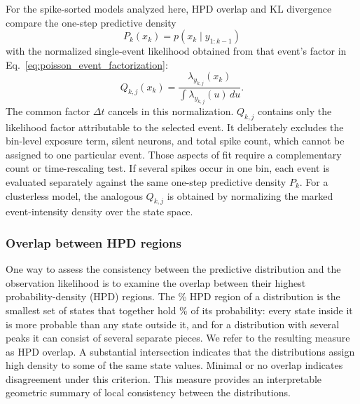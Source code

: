 \documentclass[12pt]{article}
\begin{document}
For the spike-sorted models analyzed here, HPD overlap and KL divergence compare the one-step predictive density
\begin{equation*}
    P_k(x_k) = p(x_k \mid y_{1:k-1})
\end{equation*}
with the normalized single-event likelihood obtained from that event's factor in Eq.~\eqref{eq:poisson_event_factorization}:
\begin{equation}
    \label{eq:single_event_likelihood}
    Q_{k,j}(x_k)
    = \frac{\lambda_{y_{k,j}}(x_k)}
    {\int \lambda_{y_{k,j}}(u)\,du}.
\end{equation}
The common factor $\Delta t$ cancels in this normalization. $Q_{k,j}$ contains only the likelihood factor attributable to the selected event. It deliberately excludes the bin-level exposure term, silent neurons, and total spike count, which cannot be assigned to one particular event. Those aspects of fit require a complementary count or time-rescaling test. If several spikes occur in one bin, each event is evaluated separately against the same one-step predictive density $P_k$. For a clusterless model, the analogous $Q_{k,j}$ is obtained by normalizing the marked event-intensity density over the state space.

\subsubsection*{Overlap between HPD regions}\label{sec:hpd}

One way to assess the consistency between the predictive distribution and the observation likelihood is to examine the overlap between their highest probability-density (HPD) regions. The \HpdCoveragePercent\% HPD region of a distribution is the smallest set of states that together hold \HpdCoveragePercent\% of its probability: every state inside it is more probable than any state outside it, and for a distribution with several peaks it can consist of several separate pieces. We refer to the resulting measure as HPD overlap. A substantial intersection indicates that the distributions assign high density to some of the same state values. Minimal or no overlap indicates disagreement under this criterion. This measure provides an interpretable geometric summary of local consistency between the distributions.
\end{document}
